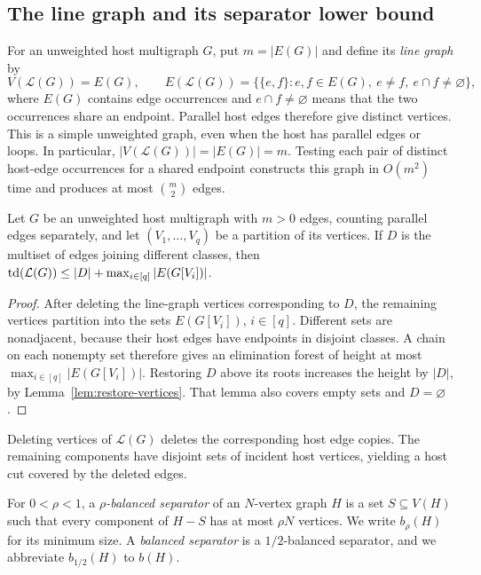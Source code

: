 \subsection{The line graph and its separator lower bound}

For an unweighted host multigraph $G$, put $m=|E(G)|$ and define
its \emph{line graph} by
\[
 V(\mathcal L(G))=E(G),\qquad
 E(\mathcal L(G))=\{\{e,f\}:e,f\in E(G),\ e\ne f,\ e\cap f\ne\varnothing\},
\]
where $E(G)$ contains edge occurrences and $e\cap f\ne\varnothing$
means that the two occurrences share an endpoint. Parallel host
edges therefore give distinct vertices.
This is a simple unweighted graph, even when the host has
parallel edges or loops. In particular,
$|V(\mathcal L(G))|=|E(G)|=m$. Testing each
pair of distinct host-edge occurrences for a shared endpoint constructs
this graph in $O(m^2)$ time and produces at most $\binom m2$ edges.

\begin{lemma}\label{lem:sse-complete}
Let $G$ be an unweighted host multigraph with $m>0$ edges, counting
parallel edges separately, and let $(V_1,\ldots,V_q)$ be a partition
of its vertices. If $D$ is the multiset of edges joining different
classes, then $\operatorname{td}(\mathcal{L}(G))\leq |D|+\max_{i\in[q]} |E(G[V_i])|$.
\end{lemma}

\begin{proof}
After deleting the line-graph vertices corresponding to $D$, the
remaining vertices partition into the sets $E(G[V_i])$, $i\in[q]$.
Different sets are nonadjacent, because their host edges have endpoints
in disjoint classes. A chain on each nonempty set therefore gives an
elimination forest of height at most $\max_{i\in[q]}|E(G[V_i])|$.
Restoring $D$ above its roots increases the height by $|D|$, by
Lemma~\ref{lem:restore-vertices}. That lemma also covers empty sets
and $D=\varnothing$.
\end{proof}

Deleting vertices of $\mathcal L(G)$ deletes the corresponding host
edge copies. The remaining components have disjoint sets of incident
host vertices, yielding a host cut covered by the deleted edges.

For $0<\rho<1$, a \emph{$\rho$-balanced separator} of an $N$-vertex
graph $H$ is a set $S\subseteq V(H)$ such that every component of
$H-S$ has at most $\rho N$ vertices. We write $b_\rho(H)$ for its
minimum size. A \emph{balanced separator} is a $1/2$-balanced
separator, and we abbreviate $b_{1/2}(H)$ to $b(H)$.

